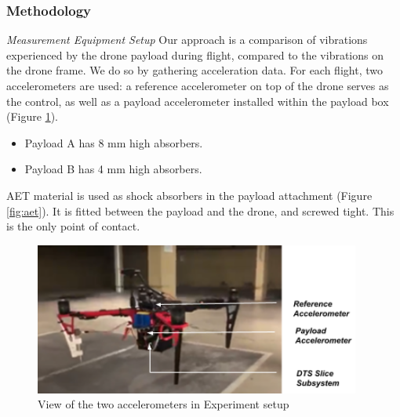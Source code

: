 \subsubsection{Methodology}



\textit{Measurement Equipment Setup} \hspace{0.3cm} Our approach is a comparison of vibrations experienced by the drone payload during flight, compared to the vibrations on the drone frame. We do so by gathering acceleration data. For each flight, two accelerometers are used: a reference accelerometer on top of the drone serves as the control, as well as a payload accelerometer installed within the payload box (Figure \ref{fig:damping}). 

\begin{itemize}
    \item Payload A has 8 mm high absorbers.
    \item Payload B has 4 mm high absorbers.
\end{itemize}

AET material is used as shock absorbers in the payload attachment (Figure \ref{fig:aet}). It is fitted between the payload and the drone, and screwed tight. This is the only point of contact. 

\begin{figure}[!h]
    \raggedright
    \includegraphics[height=5cm]{images/stage_system/absorption_test.png}
    \caption{View of the two accelerometers in Experiment setup}
    \label{fig:damping}
\end{figure}


